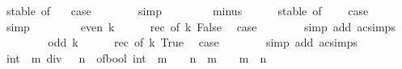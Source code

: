 \begin{isabellebody}
\ stable\ {\isacharbrackleft}{\kern0pt}of\ {}{\isacharbrackright}{\kern0pt}\ \isamarkupfalse%
\ {\isacharquery}{\kern0pt}case\isanewline
\ \ \ \ \ \ \isamarkupfalse%
\ simp\isanewline
\ \ \isamarkupfalse%
\isanewline
\ \ \ \ \isamarkupfalse%
\ minus\isanewline
\ \ \ \ \isamarkupfalse%
\ stable\ {\isacharbrackleft}{\kern0pt}of\ {\isacartoucheopen}{\isacharminus}{\kern0pt}\ {}{\isacartoucheclose}{\isacharbrackright}{\kern0pt}\ \isamarkupfalse%
\ {\isacharquery}{\kern0pt}case\isanewline
\ \ \ \ \ \ \isamarkupfalse%
\ simp\isanewline
\ \ \isamarkupfalse%
\isanewline
\ \ \ \ \isamarkupfalse%
\ {\isacharparenleft}{\kern0pt}even\ k{\isacharparenright}{\kern0pt}\isanewline
\ \ \ \ \isamarkupfalse%
\ rec\ {\isacharbrackleft}{\kern0pt}of\ k\ False{\isacharbrackright}{\kern0pt}\ \isamarkupfalse%
\ {\isacharquery}{\kern0pt}case\isanewline
\ \ \ \ \ \ \isamarkupfalse%
\ {\isacharparenleft}{\kern0pt}simp\ add{\isacharcolon}{\kern0pt}\ ac{\isacharunderscore}{\kern0pt}simps{\isacharparenright}{\kern0pt}\isanewline
\ \ \isamarkupfalse%
\isanewline
\ \ \ \ \isamarkupfalse%
\ {\isacharparenleft}{\kern0pt}odd\ k{\isacharparenright}{\kern0pt}\isanewline
\ \ \ \ \isamarkupfalse%
\ rec\ {\isacharbrackleft}{\kern0pt}of\ k\ True{\isacharbrackright}{\kern0pt}\ \isamarkupfalse%
\ {\isacharquery}{\kern0pt}case\isanewline
\ \ \ \ \ \ \isamarkupfalse%
\ {\isacharparenleft}{\kern0pt}simp\ add{\isacharcolon}{\kern0pt}\ ac{\isacharunderscore}{\kern0pt}simps{\isacharparenright}{\kern0pt}\isanewline
\ \ \isamarkupfalse%
\isanewline
\ \ \isamarkupfalse%
\ {\isacartoucheopen}{\isacharparenleft}{\kern0pt}{}{\isacharcolon}{\kern0pt}{\isacharcolon}{\kern0pt}int{\isacharparenright}{\kern0pt}\ {\isacharcircum}{\kern0pt}\ m\ div\ {}\ {\isacharcircum}{\kern0pt}\ n\ {\isacharequal}{\kern0pt}\ of{\isacharunderscore}{\kern0pt}bool\ {\isacharparenleft}{\kern0pt}{\isacharparenleft}{\kern0pt}{}{\isacharcolon}{\kern0pt}{\isacharcolon}{\kern0pt}int{\isacharparenright}{\kern0pt}\ {\isacharcircum}{\kern0pt}\ m\ {\isasymnoteq}\ {}\ {\isasymand}\ n\ {\isasymle}\ m{\isacharparenright}{\kern0pt}\ {\isacharasterisk}{\kern0pt}\ {}\ {\isacharcircum}{\kern0pt}\ {\isacharparenleft}{\kern0pt}m\ {\isacharminus}{\kern0pt}\ n{\isacharparenright}{\kern0pt}{\isacartoucheclose}\isanewline

\end{isabellebody}
